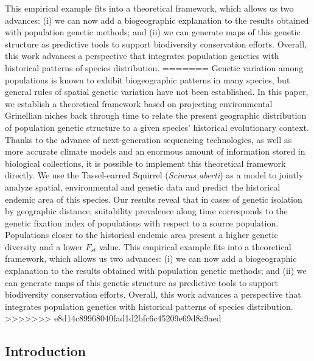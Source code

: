 \documentclass[
]{article}
\begin{document}
This empirical example fits into a theoretical framework, which allows
us two advances: (i) we can now add a biogeographic explanation to the
results obtained with population genetic methods; and (ii) we can
generate maps of this genetic structure as predictive tools to support
biodiversity conservation efforts. Overall, this work advances a
perspective that integrates population genetics with historical patterns
of species distribution.
=======
Genetic variation among populations is known to exhibit biogeographic patterns in many species, but general rules of spatial genetic variation have not been established. In this paper, we establish a theoretical framework based on projecting environmental Grinellian niches back through time to relate the present geographic distribution of population genetic structure to a given species' historical evolutionary context. Thanks to the advance of next-generation sequencing technologies, as well as more accurate climate models and an enormous amount of information stored in biological collections, it is possible to implement this theoretical framework directly. We use the Tassel-earred Squirrel (\textit{Sciurus aberti}) as a model to jointly analyze spatial, environmental and genetic data and predict the historical endemic area of this species. Our results reveal that in cases of genetic isolation by
geographic distance, suitability prevalence along time corresponds to the genetic fixation
index of populations with respect to a source population. Populations closer to the historical endemic area present a higher genetic diversity and a lower \(F_{st}\) value. This empirical example fits into a theoretical framework, which allows us two advances: (i) we can now add a biogeographic explanation to the results obtained with population genetic methods; and (ii) we can generate maps of this genetic structure as predictive tools to support biodiversity conservation efforts. Overall, this work advances a perspective that integrates population genetics with historical patterns of species distribution.
>>>>>>> e8d14c89968040fad1d2bfc6c45209e69d8a9aed

\hypertarget{introduction}{%
\subsection{Introduction}\label{introduction}}
\end{document}
